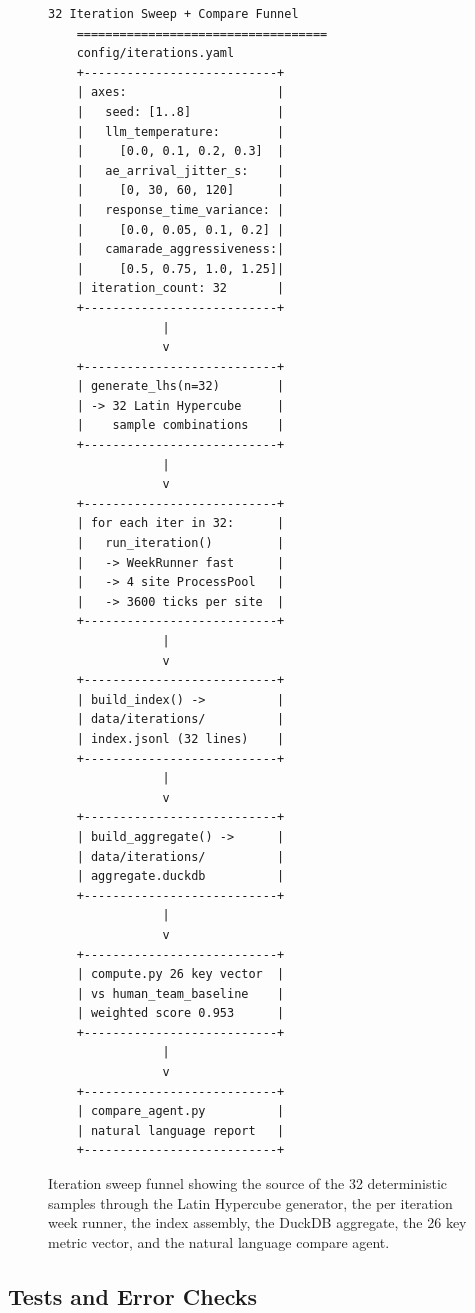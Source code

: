 \begin{sectionaccent}
\begin{figure}[H]
\centering
\begin{Verbatim}[fontsize=\footnotesize]
    32 Iteration Sweep + Compare Funnel
    ===================================
    config/iterations.yaml
    +---------------------------+
    | axes:                     |
    |   seed: [1..8]            |
    |   llm_temperature:        |
    |     [0.0, 0.1, 0.2, 0.3]  |
    |   ae_arrival_jitter_s:    |
    |     [0, 30, 60, 120]      |
    |   response_time_variance: |
    |     [0.0, 0.05, 0.1, 0.2] |
    |   camarade_aggressiveness:|
    |     [0.5, 0.75, 1.0, 1.25]|
    | iteration_count: 32       |
    +---------------------------+
                |
                v
    +---------------------------+
    | generate_lhs(n=32)        |
    | -> 32 Latin Hypercube     |
    |    sample combinations    |
    +---------------------------+
                |
                v
    +---------------------------+
    | for each iter in 32:      |
    |   run_iteration()         |
    |   -> WeekRunner fast      |
    |   -> 4 site ProcessPool   |
    |   -> 3600 ticks per site  |
    +---------------------------+
                |
                v
    +---------------------------+
    | build_index() ->          |
    | data/iterations/          |
    | index.jsonl (32 lines)    |
    +---------------------------+
                |
                v
    +---------------------------+
    | build_aggregate() ->      |
    | data/iterations/          |
    | aggregate.duckdb          |
    +---------------------------+
                |
                v
    +---------------------------+
    | compute.py 26 key vector  |
    | vs human_team_baseline    |
    | weighted score 0.953      |
    +---------------------------+
                |
                v
    +---------------------------+
    | compare_agent.py          |
    | natural language report   |
    +---------------------------+
\end{Verbatim}
\caption{Iteration sweep funnel showing the source of the 32 deterministic samples through the Latin Hypercube generator, the per iteration week runner, the index assembly, the DuckDB aggregate, the 26 key metric vector, and the natural language compare agent.}
\label{fig:iteration-funnel}
\end{figure}

\subsection{Tests and Error Checks}
\label{sec:methods-tests}


\end{sectionaccent}
